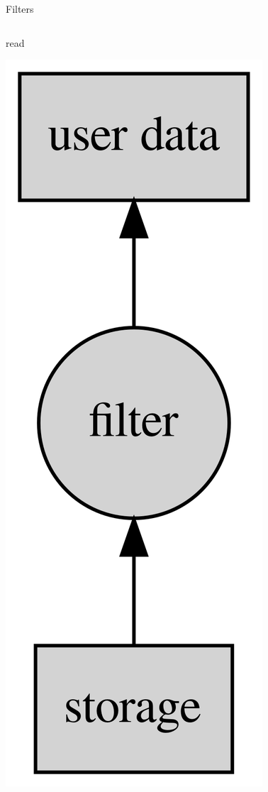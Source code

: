 \documentclass{beamer}
\begin{document}
\begin{frame}{Filters}
\begin{columns}
    \begin{block}{read}
      \begin{center}
        \includegraphics[height=0.75\textheight]{images/read-filter.png}
      \end{center}
    \end{block}
  \end{columns}
\end{frame}
\end{document}
